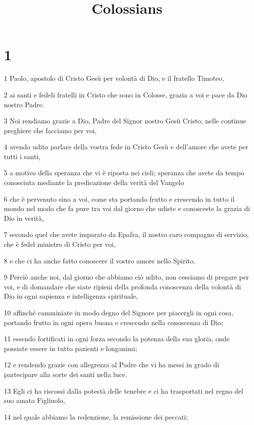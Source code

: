 

\title{Colossians}


\chapter{1}

\par 1 Paolo, apostolo di Cristo Gesù per volontà di Dio, e il fratello Timoteo,
\par 2 ai santi e fedeli fratelli in Cristo che sono in Colosse, grazia a voi e pace da Dio nostro Padre.
\par 3 Noi rendiamo grazie a Dio, Padre del Signor nostro Gesù Cristo, nelle continue preghiere che facciamo per voi,
\par 4 avendo udito parlare della vostra fede in Cristo Gesù e dell'amore che avete per tutti i santi,
\par 5 a motivo della speranza che vi è riposta nei cieli; speranza che avete da tempo conosciuta mediante la predicazione della verità del Vangelo
\par 6 che è pervenuto sino a voi, come sta portando frutto e crescendo in tutto il mondo nel modo che fa pure tra voi dal giorno che udiste e conosceste la grazia di Dio in verità,
\par 7 secondo quel che avete imparato da Epafra, il nostro caro compagno di servizio, che è fedel ministro di Cristo per voi,
\par 8 e che ci ha anche fatto conoscere il vostro amore nello Spirito.
\par 9 Perciò anche noi, dal giorno che abbiamo ciò udito, non cessiamo di pregare per voi, e di domandare che siate ripieni della profonda conoscenza della volontà di Dio in ogni sapienza e intelligenza spirituale,
\par 10 affinché camminiate in modo degno del Signore per piacergli in ogni cosa, portando frutto in ogni opera buona e crescendo nella conoscenza di Dio;
\par 11 essendo fortificati in ogni forza secondo la potenza della sua gloria, onde possiate essere in tutto pazienti e longanimi;
\par 12 e rendendo grazie con allegrezza al Padre che vi ha messi in grado di partecipare alla sorte dei santi nella luce.
\par 13 Egli ci ha riscossi dalla potestà delle tenebre e ci ha trasportati nel regno del suo amato Figliuolo,
\par 14 nel quale abbiamo la redenzione, la remissione dei peccati;
